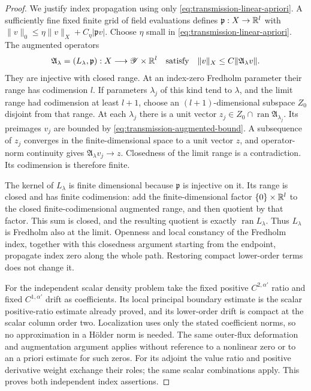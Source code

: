 \begin{proof}
We justify index propagation using only
\eqref{eq:transmission-linear-apriori}.  A sufficiently fine fixed
finite grid of field evaluations defines
$\mathfrak p:X\to\mathbb R^l$ with
$\|v\|_0\leq\eta\|v\|_X+C_\eta|\mathfrak p v|$.
Choose $\eta$ small in \eqref{eq:transmission-linear-apriori}.
The augmented operators
\begin{equation}
 \mathfrak A_\lambda=(L_\lambda,\mathfrak p):
                   X\longrightarrow\mathscr Y\times\mathbb R^l
 \quad\hbox{satisfy}\quad
 \|v\|_X\leq C\|\mathfrak A_\lambda v\|.
 \label{eq:transmission-augmented-bound}
\end{equation}
They are injective with closed range.  At an index-zero Fredholm
parameter their range has codimension $l$.  If parameters
$\lambda_j$ of this kind tend to $\lambda$, and the limit range
had codimension at least $l+1$, choose an $(l+1)$-dimensional
subspace $Z_0$ disjoint from that range.  At each $\lambda_j$
there is a unit vector $z_j\in Z_0\cap\operatorname{ran}
\mathfrak A_{\lambda_j}$.  Its preimages $v_j$ are bounded by
\eqref{eq:transmission-augmented-bound}.  A subsequence of $z_j$
converges in the finite-dimensional space to a unit vector $z$,
and operator-norm continuity gives
$\mathfrak A_\lambda v_j\to z$.  Closedness of the limit range
is a contradiction.  Its codimension is therefore finite.

The kernel of $L_\lambda$ is finite dimensional because
$\mathfrak p$ is injective on it.  Its range is closed and has
finite codimension: add the finite-dimensional factor
$\{0\}\times\mathbb R^l$ to the closed finite-codimensional augmented
range, and then quotient by that factor.  This sum is closed, and
the resulting quotient is exactly $\operatorname{ran}L_\lambda$.
Thus $L_\lambda$ is Fredholm also at the limit.  Openness and local
constancy of the Fredholm index, together with this closedness
argument starting from the endpoint, propagate index zero along
the whole path.  Restoring compact lower-order terms does not
change it.

For the independent scalar density problem take the fixed positive
$C^{2,\alpha'}$ ratio and fixed $C^{1,\alpha'}$ drift as coefficients.
Its local
principal boundary estimate is the scalar positive-ratio estimate
already proved, and its lower-order drift is compact at the scalar
column order two.  Localization uses only the stated coefficient
norms, so no approximation in a H\"older norm is needed.
The same outer-flux deformation and augmentation
argument applies without reference to a nonlinear zero or to an
a priori estimate for such zeros.  For its adjoint the value ratio
and positive derivative weight exchange their roles; the same
scalar combinations apply.  This proves both independent index
assertions.
\end{proof}

